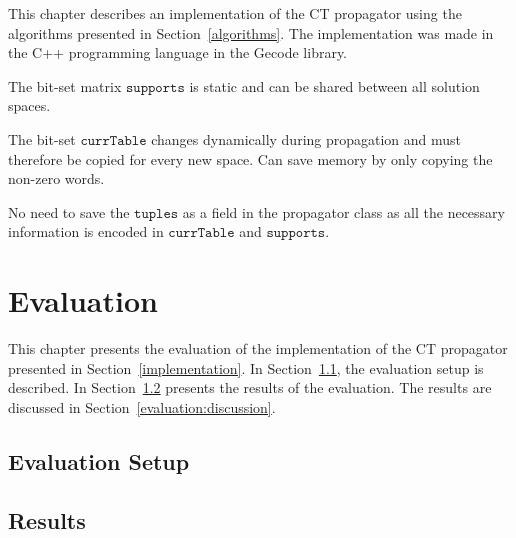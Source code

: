 \documentclass[a4paper,11pt]{article}
\newcommand{\T}[1]{\texttt{#1}}
\newcommand{\Secref}[1]{Section~\ref{#1}}
\newcommand{\Chapref}[1]{Section~\ref{#1}}
\newcommand{\CurrTable}{\texttt{currTable}}
\newcommand{\Supports}{\texttt{supports}}
\begin{document}
This chapter describes an implementation of the CT propagator using the algorithms
presented in \Chapref{algorithms}. The implementation was made in the C++ programming
language in the Gecode library.

The bit-set matrix $\Supports$ is static and can be shared between all solution spaces.

The bit-set $\CurrTable$ changes dynamically during propagation and must therefore be copied for
every new space. Can save memory by only copying the non-zero words.

No need to save the $\T{tuples}$ as a field in the propagator class as all
the necessary information is encoded in $\CurrTable$ and $\Supports$.










\section{Evaluation}
\label{evaluation}
This chapter presents the evaluation of the implementation of the CT propagator
presented in \Chapref{implementation}. In \Secref{evaluation:setup},
the evaluation setup is described. In \Secref{evaluation:results} presents
the results of the evaluation. The results are discussed in \Secref{evaluation:discussion}.

\subsection{Evaluation Setup}
\label{evaluation:setup}
\subsection{Results}
\label{evaluation:results}
\end{document}
